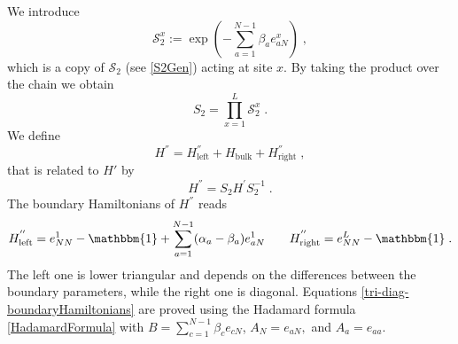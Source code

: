 \documentclass[10pt]{article}
\numberwithin{equation}{section}
\numberwithin{equation}{subsection}
\newcommand{\co}{\;,}
\newcommand{\dt}{\;.}
\begin{document}
We introduce
 \begin{equation}
 	\mathcal{S}_{2}^{x}:=\exp{\left(-\sum_{a=1}^{N-1}\beta_{a}e_{aN}^{x}\right)}\co%
 \end{equation}
which is a copy of $\mathcal{S}_{2}$ (see \eqref{S2Gen}) acting at site $x$. By taking the product over the chain we obtain 
\begin{equation}\label{S2-Whole}
	S_{2}=\prod_{x=1}^{L}\mathcal{S}_{2}^{x}\dt
\end{equation}
We define 
\begin{equation}\label{HSecond}
	H^{''}=H_{\text{left}}^{''}+H_{\text{bulk}}+H_{\text{right}}^{''}\co
\end{equation}
that is related to $H'$ by
\begin{equation}
	H^{''}=S_{2}H^{'}S_{2}^{-1}\dt
\end{equation}
The boundary Hamiltonians of $H^{''}$ reads
\begin{align}\label{tri-diag-boundaryHamiltonians}
	H_{\text{left}}^{''}=e_{NN}^{1}-\mathbbm{1}+\sum_{a=1}^{N-1}(\alpha_{a}-\beta_{a})e_{aN}^{1}\qquad H_{\text{right}}^{''}=e_{NN}^{L}-\mathbbm{1}\dt
\end{align}
The left one is lower triangular and depends on the differences between the boundary parameters, while the right one is diagonal. Equations \eqref{tri-diag-boundaryHamiltonians} are proved using the Hadamard formula \eqref{HadamardFormula} with $B=\sum_{c=1}^{N-1}\beta_{c}e_{cN}$, $A_{N}=e_{aN},$ and $A_{a}=e_{aa}$.
\begin{comment}
 We compute
\begin{enumerate}
	\item $A_{N}=e_{aN}$ with $a\neq 1$
	\begin{equation}
		\exp{\left(-\sum_{c=1}^{N-1}\beta_{c}e_{cN}\right)}e_{aN}\exp{\left(\sum_{c=1}^{N-1}\beta_{c}e_{cN}\right)}=e_{aN}
	\end{equation}
\item $A_{a}=e_{aa}$ with $a\neq 1$
\begin{equation}
		\exp{\left(-\sum_{c=1}^{N-1}\beta_{c}e_{cN}\right)}e_{aa}\exp{\left(\sum_{c=1}^{N}\beta_{c}e_{cN}\right)}=e_{aa}+\beta_{a}e_{aN}
	\end{equation}
Indeed 
\begin{equation}
	\sum_{c=1}^{N-1}[e_{cN},e_{aa}]=\sum_{c=1}^{N-1}\beta_{c}\left(e_{ca}\delta_{aN}-e_{aN}\delta_{ca}\right)=-\beta_{a}e_{aN}
\end{equation}
\end{enumerate}
\end{comment}
\end{document}
